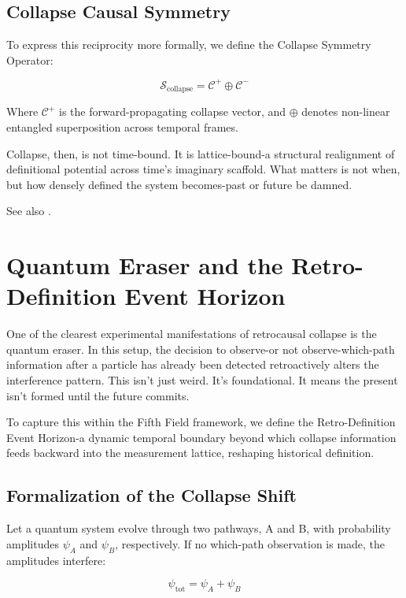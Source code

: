 \subsection{Collapse Causal Symmetry}

To express this reciprocity more formally, we define the Collapse Symmetry Operator:

\begin{equation}
\mathcal{S}_{\text{collapse}} = \mathcal{C}^+ \oplus \mathcal{C}^-
\end{equation}

Where \( \mathcal{C}^+ \) is the forward-propagating collapse vector, and \( \oplus \) denotes non-linear entangled superposition across temporal frames.

Collapse, then, is not time-bound. It is lattice-bound-a structural realignment of definitional potential across time’s imaginary scaffold. What matters is not when, but how densely defined the system becomes-past or future be damned.

See also \cite{chapter8_meta}.


\section{Quantum Eraser and the Retro-Definition Event Horizon}

One of the clearest experimental manifestations of retrocausal collapse is the quantum eraser. In this setup, the decision to observe-or not observe-which-path information after a particle has already been detected retroactively alters the interference pattern. This isn't just weird. It's foundational. It means the present isn't formed until the future commits.

To capture this within the Fifth Field framework, we define the Retro-Definition Event Horizon-a dynamic temporal boundary beyond which collapse information feeds backward into the measurement lattice, reshaping historical definition.

\subsection{Formalization of the Collapse Shift}

Let a quantum system evolve through two pathways, A and B, with probability amplitudes \( \psi_A \) and \( \psi_B \), respectively. If no which-path observation is made, the amplitudes interfere:

\[
\psi_{\text{tot}} = \psi_A + \psi_B
\]

